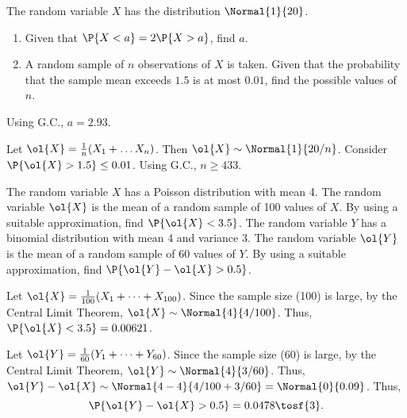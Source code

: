 \begin{problem}
    The random variable $X$ has the distribution $\Normal{1}{20}$.

    \begin{enumerate}
        \item Given that $\P{X < a} = 2\P{X > a}$, find $a$.
        \item A random sample of $n$ observations of $X$ is taken. Given that the probability that the sample mean exceeds $1.5$ is at most $0.01$, find the possible values of $n$.
    \end{enumerate}
\end{problem}
\begin{solution}
    \begin{ppart}
        Using G.C., $a = 2.93$.
    \end{ppart}
    \begin{ppart}
        Let $\ol{X} = \frac1n (X_1 + \dots X_n)$. Then $\ol{X} \sim \Normal{1}{20/n}$. Consider $\P{\ol{X} > 1.5} \leq 0.01$. Using G.C., $n \geq 433$.
    \end{ppart}
\end{solution}

\begin{problem}
    The random variable $X$ has a Poisson distribution with mean 4. The random variable $\ol{X}$ is the mean of a random sample of 100 values of $X$. By using a suitable approximation, find $\P{\ol{X} < 3.5}$. The random variable $Y$ has a binomial distribution with mean 4 and variance 3. The random variable $\ol{Y}$ is the mean of a random sample of 60 values of $Y$. By using a suitable approximation, find $\P{\ol{Y} - \ol{X} > 0.5}$.
\end{problem}
\begin{solution}
    Let $\ol{X} = \frac1{100} (X_1 + \dots + X_{100})$. Since the sample size (100) is large, by the Central Limit Theorem, $\ol{X} \sim \Normal{4}{4/100}$. Thus, $\P{\ol{X} < 3.5} = 0.00621$.

    Let $\ol{Y} = \frac1{60} (Y_1 + \dots + Y_{60})$. Since the sample size (60) is large, by the Central Limit Theorem, $\ol{Y} \sim \Normal{4}{3/60}$. Thus, $\ol{Y} - \ol{X} \sim \Normal{4-4}{4/100 + 3/60} = \Normal{0}{0.09}$. Thus, \[\P{\ol{Y} - \ol{X} > 0.5} = 0.0478 \tosf{3}.\]
\end{solution}

